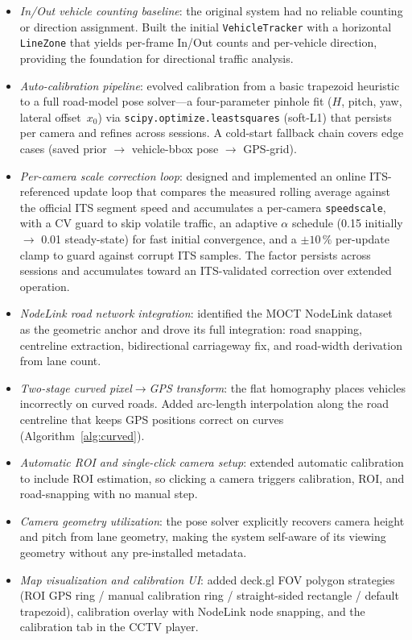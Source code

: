 \documentclass[conference]{IEEEtran}
\renewcommand{\_}{\textunderscore\allowbreak}
\begin{document}
\begin{itemize}
  \item \emph{In/Out vehicle counting baseline}:
  the original system had no reliable counting or direction assignment.
  Built the initial \texttt{VehicleTracker} with a horizontal \texttt{LineZone}
  that yields per-frame In/Out counts and per-vehicle direction, providing the
  foundation for directional traffic analysis.
  \item \emph{Auto-calibration pipeline}:
  evolved calibration from a basic trapezoid heuristic to a full road-model pose
  solver---a four-parameter pinhole fit ($H$, pitch, yaw, lateral offset~$x_0$)
  via \texttt{scipy.optimize.least\_squares} (soft-L1) that persists per camera
  and refines across sessions. A cold-start fallback chain covers edge cases
  (saved prior $\to$ vehicle-bbox pose $\to$ GPS-grid).
  \item \emph{Per-camera scale correction loop}:
  designed and implemented an online ITS-referenced update loop that compares the
  measured rolling average against the official ITS segment speed and accumulates
  a per-camera \texttt{speed\_scale}, with a CV guard to skip volatile traffic,
  an adaptive $\alpha$ schedule (0.15 initially $\to$ 0.01 steady-state) for fast
  initial convergence, and a $\pm10\,\%$ per-update clamp to guard against corrupt
  ITS samples. The factor persists across sessions and accumulates toward an
  ITS-validated correction over extended operation.
  \item \emph{NodeLink road network integration}:
  identified the MOCT NodeLink dataset~\cite{moct_nodelink} as the geometric
  anchor and drove its full integration: road snapping, centreline extraction,
  bidirectional carriageway fix, and road-width derivation from lane count.
  \item \emph{Two-stage curved pixel$\to$GPS transform}:
  the flat homography places vehicles incorrectly on curved roads. Added
  arc-length interpolation along the road centreline that keeps GPS positions
  correct on curves (Algorithm~\ref{alg:curved}).
  \item \emph{Automatic ROI and single-click camera setup}:
  extended automatic calibration to include ROI estimation, so clicking a camera
  triggers calibration, ROI, and road-snapping with no manual step.
  \item \emph{Camera geometry utilization}:
  the pose solver explicitly recovers camera height and pitch from lane geometry,
  making the system self-aware of its viewing geometry without any pre-installed
  metadata.
  \item \emph{Map visualization and calibration UI}:
  added deck.gl FOV polygon strategies (ROI GPS ring / manual calibration ring /
  straight-sided rectangle / default trapezoid), calibration overlay with
  NodeLink node snapping, and the calibration tab in the CCTV player.
\end{itemize}
\end{document}
